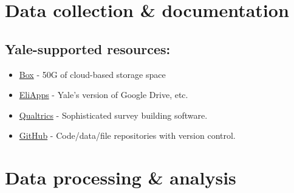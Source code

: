 \documentclass{tufte-handout}
\begin{document}
\section{Data collection \& documentation}\label{data-collection-documentation}

\subsection{Yale-supported resources:}\label{yale-supported}

\begin{itemize}
\item
  \href{http://its.yale.edu/services/collaboration-and-file-sharing/box-yale}{Box} - 50G of cloud-based storage space
\item
  \href{http://its.yale.edu/services/email-and-calendars/eliapps-google-apps-education}{EliApps} - Yale's version of Google Drive, etc.
\item
  \href{http://its.yale.edu/services/web-and-application-services/qualtrics-survey-tool}{Qualtrics} - Sophisticated survey building software.
\item
  \href{http://its.yale.edu/services/web-and-application-services/github-enterprise}{GitHub} - Code/data/file repositories with version control.
\end{itemize}



\section{Data processing \& analysis}\label{data-processing-analysis}
\end{document}
